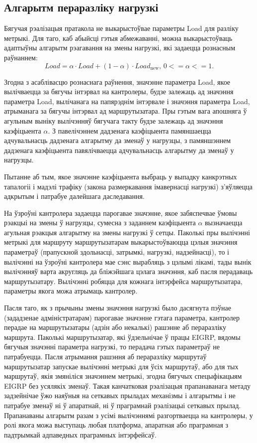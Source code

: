 \subsection{Алгарытм пераразліку нагрузкі}

Бягучая рэалізацыя пратакола не выкарыстоўвае параметры Load для разліку метрыкі. Для таго, каб абыйсці гэтыя абмежаванні, можна выкарыстоўваць
адаптыўны алгарытм рэагавання на змены нагрузкі, які задаецца рознасным раўнаннем:
\begin{equation}
    Load = \alpha \cdot Load + (1 - \alpha) \cdot Load_\text{new}\text{, } 0 <= \alpha <= 1.
\end{equation}

Згодна з асаблівасцю рознаснага раўнення, значэнне параметра Load,
якое вылічваецца за бягучы інтэрвал на кантролеры, будзе залежаць ад значэння
параметра Load, вылічанага на папярэднім інтэрвале і значэння параметра Load, атрыманага за бягучы інтэрвал ад маршрутызатара. Пры гэтым вага
апошняга ў агульным выніку вылічэнняў бягучага такту будзе залежаць ад
значэння каэфіцыента $\alpha$. З павелічэннем дадзенага каэфіцыента памяншаецца адчувальнасць дадзенага алгарытму да зменаў у нагрузцы, з памяншэннем дадзенага каэфіцыента павялічваецца адчувальнасць алгарытму
да зменаў у нагрузцы.

Пытанне аб тым, якое значэнне каэфіцыента выбраць
у выпадку канкрэтных тапалогіі і мадэлі трафіку (закона размеркавання імавернасці нагрузкі) з'яўляецца адкрытым і патрабуе далейшага даследавання.

На ўзроўні кантролера задаецца парогавае значэнне, якое забяспечвае ўмовы рэакцыі на змены ў нагрузцы, сумесна з заданнем каэфіцыента $\alpha$ вызначаецца агульная рэакцыя алгарытму на змены нагрузкі ў сетцы.
Паколькі пры вылічэнні метрыкі для маршруту маршрутызатарам выкарыстоўваюцца цэлыя значэння параметраў (прапускной здольнасці, затрымкі,
нагрузкі, надзейнасці), то і вылічэнні на ўзроўні кантролера мае сэнс
вырабляць з цэлымі лікамі, тады вынік вылічэнняў варта акругляць
да бліжэйшага цэлага значэння, каб пасля перадаваць маршрутызатару.
Вылічэнні робяцца для кожнага інтэрфейса маршрутызатара, параметры якога можа атрымаць кантролер.

Пасля таго, як з прычыны змены значэння нагрузкі было дасягнута пэўнае (зададзенае адміністратарам) парогавае значэнне гэтага параметра, кантролер перадае на маршрутызатары (адзін або некалькі) рашэнне
аб пераразліку маршрута. Паколькі маршрутызатар, які ўдзельнічае ў працы
EIGRP, вядомы бягучыя значэнні параметра нагрузкі, то перадача гэтых параметраў не патрабуецца. Пасля атрымання рашэння аб пераразліку маршрутаў
маршрутызатар запускае вылічэнні метрыкі для ўсіх маршрутаў, або для тых
маршрутаў, якія змяніліся значэннем метрыкі, згодна
бягучых спецыфікацыям EIGRP без усялякіх зменаў. Такая канчатковая рэалізацыя прапанаванага метаду задзейнічае ўжо наяўныя на сеткавых прыладах механізмы і алгарытмы і не патрабуе зменаў ні ў апаратнай, ні
ў праграмнай рэалізацыі сеткавых прылад. Прапанаваны алгарытм разам
з усімі вылічэннямі разгортваецца на кантролеры, у ролі якога можа
выступаць любая платформа, апаратная або праграмная з падтрымкай адпаведных праграмных інтэрфейсаў.


